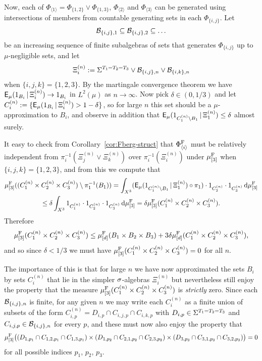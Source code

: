 \documentclass[12pt]{article}
\begin{document}
Now, each of $\Phi_{\langle 1\rangle} =
\Phi_{\{1,2\}}\vee\Phi_{\{1,3\}}$, $\Phi_{\langle 2\rangle}$ and
$\Phi_{\langle 3\rangle}$ can be generated using intersections of
members from countable generating sets in each $\Phi_{\{i,j\}}$. Let
\[\B_{\{i,j\},1}\subseteq \B_{\{i,j\},2}\subseteq \ldots\]
be an increasing sequence of finite subalgebras of sets that
generates $\Phi_{\{i,j\}}$ up to $\mu$-negligible sets, and let
\[\Xi^{(n)}_i := \S^{T_1 = T_2 = T_3}\vee\B_{\{i,j\},n}\vee\B_{\{i,k\},n}\]
when $\{i,j,k\} = \{1,2,3\}$. By the martingale convergence theorem
we have $\sfE_\mu(1_{B_i}\,|\,\Xi^{(n)}_i) \to 1_{B_i}$ in
$L^2(\mu)$ as $n\to\infty$.  Now pick $\delta \in (0,1/3)$ and let
$C_i^{(n)} := \{\sfE_\mu(1_{B_i}\,|\,\Xi^{(n)}_i) > 1 - \delta\}$,
so for large $n$ this set should be a $\mu$-approximation to $B_i$,
and observe in addition that $\sfE_\mu(1_{C_1^{(n)}\setminus
B_1}\,|\,\Xi^{(n)}_1)\leq \delta$ almost surely.

It easy to check from Corollary~\ref{cor:Fberg-struct} that
$\Phi_{\langle i\rangle}^{\rm{F}}$ must be relatively independent
from $\pi_i^{-1}(\Xi^{(n)}_j\vee\Xi^{(n)}_k)$ over
$\pi_i^{-1}(\Xi^{(n)}_i)$ under $\mu^{\rm{F}}_{[3]}$ when $\{i,j,k\}
= \{1,2,3\}$, and from this we compute that
\begin{multline*}
\mu^{\rm{F}}_{[3]}((C_1^{(n)}\times C_2^{(n)}\times
C_3^{(n)})\setminus \pi_1^{-1}(B_1)) =
\int_{X^3}(\sfE_\mu(1_{C_1^{(n)}\setminus
B_1}\,|\,\Xi^{(n)}_1)\circ\pi_1)\cdot 1_{C^{(n)}_2}\cdot
1_{C^{(n)}_3}\,\d\mu^{\rm{F}}_{[3]}\\
\leq \delta\int_{X^3}1_{C^{(n)}_1}\cdot 1_{C^{(n)}_2}\cdot
1_{C^{(n)}_3}\,\d\mu^{\rm{F}}_{[3]} =
\delta\mu^{\rm{F}}_{[3]}(C_1^{(n)}\times C^{(n)}_2\times C^{(n)}_3).
\end{multline*}
Therefore
\[\mu^{\rm{F}}_{[3]}(C_1^{(n)}\times C^{(n)}_2\times C^{(n)}_3) \leq \mu^{\rm{F}}_{[d]}(B_1 \times B_2\times B_3) + 3\delta\mu^{\rm{F}}_{[d]}(C_1^{(n)}\times C^{(n)}_2\times C^{(n)}_3),\]
and so since $\delta < 1/3$ we must have
$\mu^{\rm{F}}_{[3]}(C_1^{(n)}\times C^{(n)}_2\times C^{(n)}_3) = 0$
for all $n$.

The importance of this is that for large $n$ we have now
approximated the sets $B_i$ by sets $C_i^{(n)}$ that lie in the
simpler $\s$-algebras $\Xi^{(n)}_i$ but nevertheless still enjoy the
property that the measure $\mu^{\rm{F}}_{[3]}(C_1^{(n)}\times
C^{(n)}_2\times C^{(n)}_3)$ is \emph{strictly} zero. Since each
$\B_{\{i,j\},n}$ is finite, for any given $n$ we may write each
$C_i^{(n)}$ as a finite union of subsets of the form $C_{i,p}^{(n)}
= D_{i,p}\cap C_{i,j,p}\cap C_{i,k,p}$ with $D_{i,p} \in \S^{T_1 =
T_2 = T_3}$ and $C_{i,j,p} \in \B_{\{i,j\},n}$ for every $p$, and
these must now also enjoy the property that
\[\mu^{\rm{F}}_{[3]}\big((D_{1,p_1}\cap C_{1,2,p_1}\cap C_{1,3,p_1})\times (D_{1,p_2}\cap C_{2,1,p_2}\cap C_{2,3,p_2})\times (D_{3,p_3}\cap C_{3,1,p_3}\cap C_{3,2,p_3})\big) = 0\]
for all possible indices $p_1$, $p_2$, $p_3$.
\end{document}
